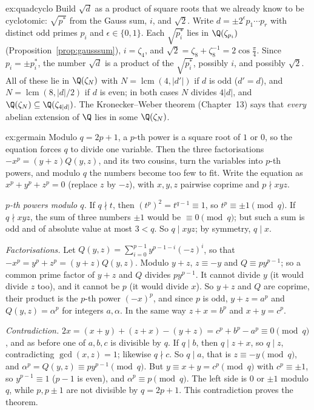 \begin{solution}{ex:quadcyclo}
\idea Build $\sqrt d$ as a product of square roots that we already know to be cyclotomic: $\sqrt{p^*}$ from the Gauss sum,
$i$, and $\sqrt2$.
\writeup Write $d=\pm2^{\epsilon}p_1\cdots p_r$ with distinct odd primes $p_i$ and $\epsilon\in\{0,1\}$. Each $\sqrt{p_i^*}$ lies
in $\Q(\zeta_{p_i})$ (Proposition~\ref{prop:gausssum}), $i=\zeta_4$, and $\sqrt2=\zeta_8+\zeta_8^{-1}=2\cos\frac\pi4$. Since
$p_i=\pm p_i^*$, the number $\sqrt d$ is a product of the $\sqrt{p_i^*}$, possibly $i$, and possibly $\sqrt2$. All of these lie
in $\Q(\zeta_N)$ with $N=\operatorname{lcm}(4,|d'|)$ if $d$ is odd ($d'=d$), and $N=\operatorname{lcm}(8,|d|/2)$ if $d$ is
even; in both cases $N$ divides $4|d|$, and $\Q(\zeta_N)\subseteq\Q(\zeta_{4|d|})$. The Kronecker--Weber theorem (Chapter~13)
says that \emph{every} abelian extension of $\Q$ lies in some $\Q(\zeta_N)$.
\end{solution}

\begin{solution}{ex:germain}
\idea Modulo $q=2p+1$, a $p$-th power is a square root of $1$ or $0$, so the equation forces $q$ to divide one variable. Then
the three factorisations $-x^p=(y+z)Q(y,z)$, and its two cousins, turn the variables into $p$-th powers, and modulo $q$ the
numbers become too few to fit.
\writeup Write the equation as $x^p+y^p+z^p=0$ (replace $z$ by $-z$), with $x,y,z$ pairwise coprime and $p\nmid xyz$.

\emph{$p$-th powers modulo $q$.} If $q\nmid t$, then $(t^p)^2=t^{q-1}\equiv1$, so $t^p\equiv\pm1\pmod q$. If $q\nmid xyz$, the
sum of three numbers $\pm1$ would be $\equiv0\pmod q$; but such a sum is odd and of absolute value at most $3<q$. So $q\mid
xyz$; by symmetry, $q\mid x$.

\emph{Factorisations.} Let $Q(y,z)=\sum_{i=0}^{p-1}y^{p-1-i}(-z)^i$, so that $-x^p=y^p+z^p=(y+z)Q(y,z)$. Modulo $y+z$, $z\equiv-y$
and $Q\equiv py^{p-1}$; so a common prime factor of $y+z$ and $Q$ divides $py^{p-1}$. It cannot divide $y$ (it would divide $z$
too), and it cannot be $p$ (it would divide $x$). So $y+z$ and $Q$ are coprime, their product is the $p$-th power $(-x)^p$, and
since $p$ is odd, $y+z=a^p$ and $Q(y,z)=\alpha^p$ for integers $a,\alpha$. In the same way $z+x=b^p$ and $x+y=c^p$.

\emph{Contradiction.} $2x=(x+y)+(z+x)-(y+z)=c^p+b^p-a^p\equiv0\pmod q$, and as before one of $a,b,c$ is divisible by $q$. If $q
\mid b$, then $q\mid z+x$, so $q\mid z$, contradicting $\gcd(x,z)=1$; likewise $q\nmid c$. So $q\mid a$, that is $z\equiv-y
\pmod q$, and $\alpha^p=Q(y,z)\equiv py^{p-1}\pmod q$. But $y\equiv x+y=c^p\pmod q$ with $c^p\equiv\pm1$, so $y^{p-1}\equiv1$ ($p-1$
is even), and $\alpha^p\equiv p\pmod q$. The left side is $0$ or $\pm1$ modulo $q$, while $p,p\pm1$ are not divisible by
$q=2p+1$. This contradiction proves the theorem.
\end{solution}

